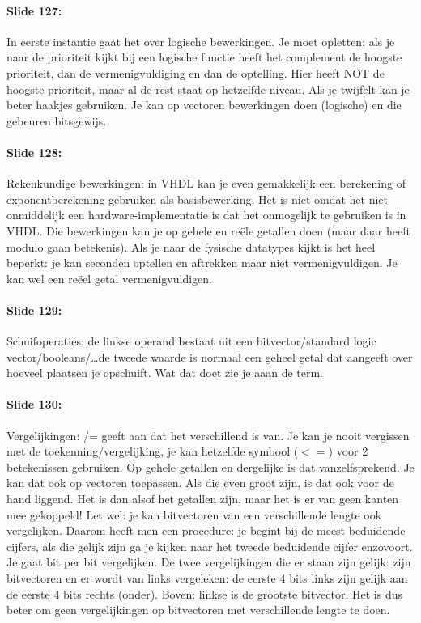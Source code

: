\documentclass[10pt,a4paper]{book}
\begin{document}
\paragraph{Slide 127:} In eerste instantie gaat het over logische bewerkingen. Je moet opletten: als je naar de prioriteit kijkt bij een logische functie heeft het complement de hoogste prioriteit, dan de vermenigvuldiging en dan de optelling. Hier heeft NOT de hoogste prioriteit, maar al de rest staat op hetzelfde niveau. Als je twijfelt kan je beter haakjes gebruiken. Je kan op vectoren bewerkingen doen (logische) en die gebeuren bitsgewijs. 

\paragraph{Slide 128:} Rekenkundige bewerkingen: in VHDL kan je even gemakkelijk een berekening of exponentberekening gebruiken als basisbewerking. Het is niet omdat het niet onmiddelijk een hardware-implementatie is dat het onmogelijk te gebruiken is in VHDL. Die bewerkingen kan je op gehele en re\"ele getallen doen (maar daar heeft modulo gaan betekenis). Als je naar de fysische datatypes kijkt is het heel beperkt: je kan seconden optellen en aftrekken maar niet vermenigvuldigen. Je kan wel een re\"eel getal vermenigvuldigen.

\paragraph{Slide 129:} Schuifoperaties: de linkse operand bestaat uit een bitvector/standard logic vector/booleans/\ldots de tweede waarde is normaal een geheel getal dat aangeeft over hoeveel plaatsen je opschuift. Wat dat doet zie je aaan de term.

\paragraph{Slide 130:} Vergelijkingen: /= geeft aan dat het verschillend is van. Je kan je nooit vergissen met de toekenning/vergelijking, je kan hetzelfde symbool ($<=$) voor 2 betekenissen gebruiken. Op gehele getallen en dergelijke is dat vanzelfsprekend. Je kan dat ook op vectoren toepassen. Als die even groot zijn, is dat ook voor de hand liggend. Het is dan alsof het getallen zijn, maar het is er van geen kanten mee gekoppeld! Let wel: je kan bitvectoren van een verschillende lengte ook vergelijken. Daarom heeft men een procedure: je begint bij de meest beduidende cijfers, als die gelijk zijn ga je kijken naar het tweede beduidende cijfer enzovoort. Je gaat bit per bit vergelijken. De twee vergelijkingen die er staan zijn gelijk: zijn bitvectoren en er wordt van links vergeleken: de eerste 4 bits links zijn gelijk aan de eerste 4 bits rechts (onder). Boven: linkse is de grootste bitvector. Het is dus beter om geen vergelijkingen op bitvectoren met verschillende lengte te doen.
\end{document}
